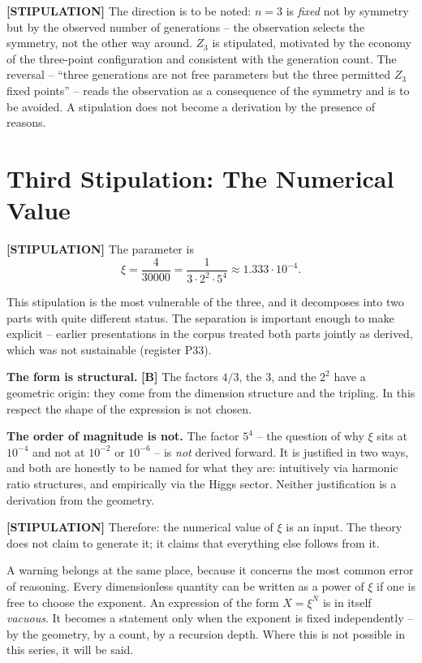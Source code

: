 \textbf{[STIPULATION]} The direction is to be noted: $n=3$ is \emph{fixed} not
by symmetry but by the observed number of generations -- the observation
selects the symmetry, not the other way around. $Z_3$ is stipulated, motivated
by the economy of the three-point configuration and consistent with the
generation count. The reversal -- ``three generations are not free parameters
but the three permitted $Z_3$ fixed points'' -- reads the observation as a
consequence of the symmetry and is to be avoided. A stipulation does not become
a derivation by the presence of reasons.

\section{Third Stipulation: The Numerical Value}

\textbf{[STIPULATION]} The parameter is
\[
  \xi = \frac{4}{30000} = \frac{1}{3\cdot 2^2\cdot 5^4}
  \approx 1{.}333\cdot 10^{-4}.
\]

This stipulation is the most vulnerable of the three, and it decomposes into
two parts with quite different status. The separation is important enough to
make explicit -- earlier presentations in the corpus treated both parts jointly
as derived, which was not sustainable (register P33).

\textbf{The form is structural.} \textbf{[B]} The factors $4/3$, the $3$, and
the $2^2$ have a geometric origin: they come from the dimension structure and
the tripling. In this respect the shape of the expression is not chosen.

\textbf{The order of magnitude is not.} The factor $5^4$ -- the question of
why $\xi$ sits at $10^{-4}$ and not at $10^{-2}$ or $10^{-6}$ -- is
\emph{not} derived forward. It is justified in two ways, and both are honestly
to be named for what they are: intuitively via harmonic ratio structures, and
empirically via the Higgs sector. Neither justification is a derivation from
the geometry.

\textbf{[STIPULATION]} Therefore: the numerical value of $\xi$ is an input.
The theory does not claim to generate it; it claims that everything else
follows from it.

A warning belongs at the same place, because it concerns the most common
error of reasoning. Every dimensionless quantity can be written as a power
of $\xi$ if one is free to choose the exponent. An expression of the form
$X = \xi^N$ is in itself \emph{vacuous}. It becomes a statement only when
the exponent is fixed independently -- by the geometry, by a count, by a
recursion depth. Where this is not possible in this series, it will be said.

